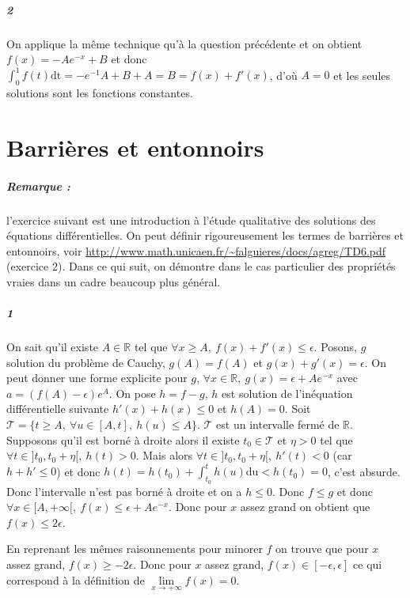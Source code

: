 \documentclass[10pt,a4paper]{article}
\begin{document}
\subparagraph{2} On applique la même technique qu'à la question précédente et on obtient $f(x) = -Ae^{-x} +B$ et donc $\int_0^1 f(t) \text{dt} = -e^{-1}A +B + A = B = f(x) + f'(x)$, d'où $A = 0$ et les seules solutions sont les fonctions constantes.

\section{Barrières et entonnoirs}
\subparagraph{Remarque :} l'exercice suivant est une introduction à l'étude qualitative des solutions des équations différentielles. On peut définir rigoureusement les termes de barrières et entonnoirs, voir \url{http://www.math.unicaen.fr/~falguieres/docs/agreg/TD6.pdf} (exercice 2). Dans ce qui suit, on démontre dans le cas particulier des propriétés vraies dans un cadre beaucoup plus général.

\subparagraph{1} 
On sait qu'il existe $A \in \mathbb{R}$ tel que $\forall x \ge A, \ f(x) + f'(x) \le \epsilon$. Posons, $g$ solution du problème de Cauchy, $g(A) = f(A)$ et $g(x) + g'(x) = \epsilon$. On peut donner une forme explicite pour $g$, $\forall x \in \mathbb{R}, \ g(x) = \epsilon + Ae^{-x}$ avec $a =  \left( f(A) - \epsilon \right)e^A$. On pose $h = f-g$, $h$ est solution de l'inéquation différentielle suivante $h'(x) + h(x) \le 0$ et $h(A) = 0$. Soit $\mathcal{T} = \lbrace t \ge A, \ \forall u \in [A,t], \ h(u) \le A \rbrace$. $\mathcal{T}$ est un intervalle fermé de $\mathbb{R}$. Supposons qu'il est borné à droite alors il existe $t_0 \in \mathcal{T}$ et $\eta>0$ tel que $\forall t \in ]t_0, t_0 +\eta[, \ h(t)>0$. Mais alors $\forall t \in ]t_0, t_0 +\eta[, \ h'(t)<0$ (car $h+h' \le 0$) et donc $h(t) = h(t_0)+ \int_{t_0}^t h(u) \text{du} < h(t_0) = 0$, c'est absurde. Donc l'intervalle n'est pas borné à droite et on a $h \le 0$. Donc $f \le g$ et donc $\forall x \in [A,+\infty[, \ f(x) \le \epsilon + Ae^{-x}$. Donc pour $x$ assez grand on obtient que $f(x) \le 2\epsilon$. 

En reprenant les mêmes raisonnements pour minorer $f$ on trouve que pour $x$ assez grand, $f(x) \ge -2\epsilon$. Donc pour $x$ assez grand, $f(x) \in [-\epsilon,\epsilon]$ ce qui correspond à la définition de $\underset{x \rightarrow +\infty}{\lim} f(x) = 0$.
\end{document}
